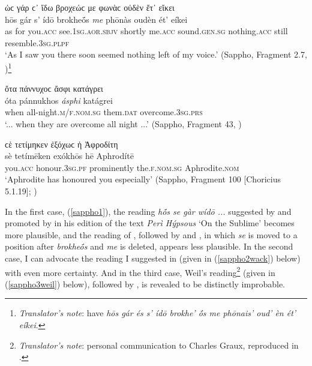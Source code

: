 \begin{exe}
\ex ὡϲ γάρ ϲ᾽ ἴδω βροχεώϲ {με} φωνὰϲ οὐδὲν ἔτ᾽ εἴκει\\
\gll hōs gár s' ídō brokheṓs \emph{me} phōnàs oudèn ét' eíkei\\
as for you.\textsc{acc} see.\textsc{1sg.aor.sbjv} shortly me.\textsc{acc} sound.\textsc{gen.sg} nothing.\textsc{acc} still resemble.\textsc{3sg.plpf}\\
\trans `As I saw you there soon seemed nothing left of my voice.' (Sappho, Fragment 2.7, \citealp[31.7]{LobelPage1968})\footnote{\emph{Translator's note}: \citet{LobelPage1968} have \textit{hōs gár és s' ídō brokhe' ṓs me phōnais' oud' èn ét' eíkei}.}
\label{sappho1}
\end{exe}

\begin{exe}
\ex ὄτα πάννυχοϲ {ἄσφι} κατάγρει\\
\gll óta pánnukhos \emph{ásphi} katágrei\\
when all-night.\textsc{m/f.nom.sg} them.\textsc{dat} overcome.\textsc{3sg.prs}\\
\trans `... when they are overcome all night ...' (Sappho, Fragment 43, \citealp[149.1]{LobelPage1968})
\label{sappho2}
\end{exe}

\begin{exe}
\ex ϲὲ τετίμηκεν ἐξόχωϲ ἡ Ἀφροδίτη\\
\gll sè tetímēken exókhōs hē Aphrodítē\\
you.\textsc{acc} honour.\textsc{3sg.pf} prominently the.\textsc{f.nom.sg} Aphrodite.\textsc{nom}\\
\trans `Aphrodite has honoured you especially' (Sappho, Fragment 100 {[}Choricius 5.1.19{]}; \citealp[97]{Graux1886})
\label{sappho3}
\end{exe}

In the first case, (\ref{sappho1}), the reading \textit{hṓs se gàr wídō ...} suggested by \citet[360]{Ahrens1839} and promoted by \citeauthor{Vahlen1887} in his edition of the text \textit{Perì Hýpsous} `On the Sublime' \citep[section x.2]{Vahlen1887} becomes more plausible, and the reading of \citet{Seidler1829}, followed by \citet{Bergk1854} and \citet{Hiller1890}, in which \textit{se} is moved to a position after \textit{brokheṓs} and \textit{me} is deleted, appears less plausible. In the second case, I can advocate the reading I suggested in \citet[141]{Wackernagel1887} (given in (\ref{sappho2wack}) below) with even more certainty. And in the third case, Weil's reading\footnote{\emph{Translator's note}: personal communication to Charles Graux, reproduced in \citet[98]{Graux1886}.} (given in (\ref{sappho3weil}) below), followed by \citet[Fragment 97]{Hiller1890}, is revealed to be distinctly improbable.


